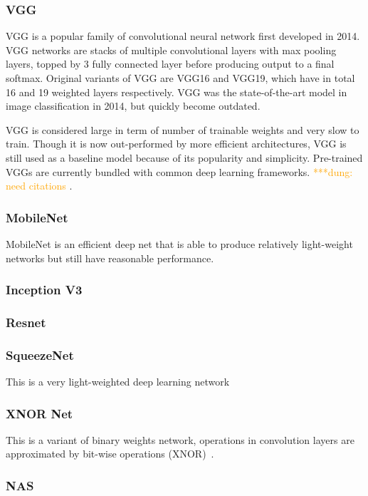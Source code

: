 \documentclass[conference]{IEEEtran}
\newcommand{\dungnote}[1]{ {\textcolor{orange} { ***dung: #1 }}}
\newcommand{\dungnote}[1]{}
\begin{document}
\subsubsection{VGG}
VGG is a popular family of convolutional neural network first developed in 2014. VGG networks are stacks of multiple convolutional layers with max pooling layers, topped by 3 fully connected layer before producing output to a final softmax. Original variants of VGG are VGG16 and VGG19, which have in total 16 and 19 weighted layers respectively. VGG was the state-of-the-art model in image classification in 2014, but quickly become outdated.

VGG is considered large in term of number of trainable weights and very slow to train. Though it is now out-performed by more efficient architectures, VGG is still used as a baseline model because of its popularity and simplicity. Pre-trained VGGs are currently bundled with common deep learning frameworks. \dungnote{need citations}.

\subsubsection{MobileNet}
MobileNet is an efficient deep net that is able to produce relatively light-weight networks but still have reasonable performance. ~\cite{howard2017mobilenets}

\subsubsection{Inception V3}

\subsubsection{Resnet}

\subsubsection{SqueezeNet}
This is a very light-weighted deep learning network~\cite{shen2018cs}

\subsubsection{XNOR Net}
This is a variant of binary weights network, operations in convolution layers are approximated by bit-wise operations (XNOR)~\cite{rastegari2016xnor}.

\subsubsection{NAS }
\end{document}
